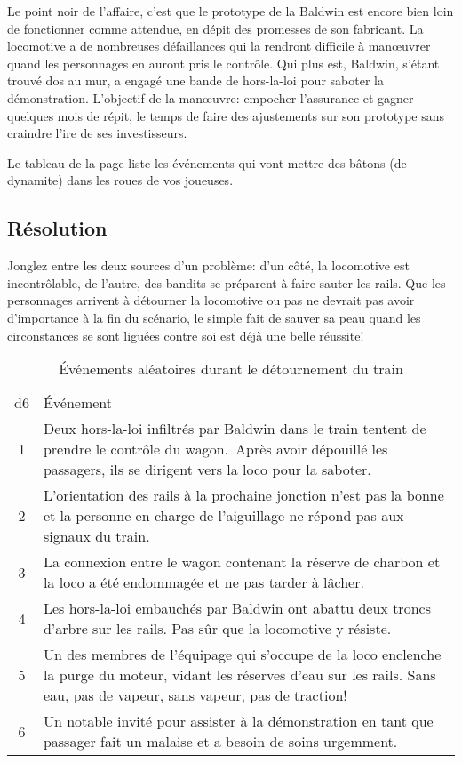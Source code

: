 Le point noir de l'affaire, c'est que le prototype de la Baldwin est encore bien loin de fonctionner comme attendue, en dépit des promesses de son fabricant.
La locomotive a de nombreuses défaillances qui la rendront difficile à manœuvrer quand les personnages en auront pris le contrôle.
Qui plus est, Baldwin, s'étant trouvé dos au mur, a engagé une bande de hors-la-loi pour saboter la démonstration.
L'objectif de la manœuvre: empocher l'assurance et gagner quelques mois de répit, le temps de faire des ajustements sur son prototype sans craindre l'ire de ses investisseurs.

Le tableau de la page \pageref{table:rail} liste les événements qui vont mettre des bâtons (de dynamite) dans les roues de vos joueuses.

\subsection{Résolution}

Jonglez entre les deux sources d'un problème: d'un côté, la locomotive est incontrôlable, de l'autre, des bandits se préparent à faire sauter les rails.
Que les personnages arrivent à détourner la locomotive ou pas ne devrait pas avoir d'importance à la fin du scénario, le simple fait de sauver sa peau quand les circonstances se sont liguées contre soi est déjà une belle réussite!

\begin{table}
	\caption{Événements aléatoires durant le détournement du train}
	\label{table:rail}
	\begin{tabularx}{\textwidth}{cX}
	d6 & Événement\\
	1  & Deux hors-la-loi infiltrés par Baldwin dans le train tentent de prendre le contrôle du wagon. Après avoir dépouillé les passagers, ils se dirigent vers la loco pour la saboter.\\
	2  & L'orientation des rails à la prochaine jonction n'est pas la bonne et la personne en charge de l'aiguillage ne répond pas aux signaux du train.\\
	3  & La connexion entre le wagon contenant la réserve de charbon et la loco a été endommagée et ne pas tarder à lâcher.\\
	4  & Les hors-la-loi embauchés par Baldwin ont abattu deux troncs d'arbre sur les rails. Pas sûr que la locomotive y résiste.\\
	5  & Un des membres de l'équipage qui s'occupe de la loco enclenche la purge du moteur, vidant les réserves d'eau sur les rails. Sans eau, pas de vapeur, sans vapeur, pas de traction!\\
	6  & Un notable invité pour assister à la démonstration en tant que passager fait un malaise et a besoin de soins urgemment.\\
	\end{tabularx}
\end{table}

\vfill
{}
\vfill
